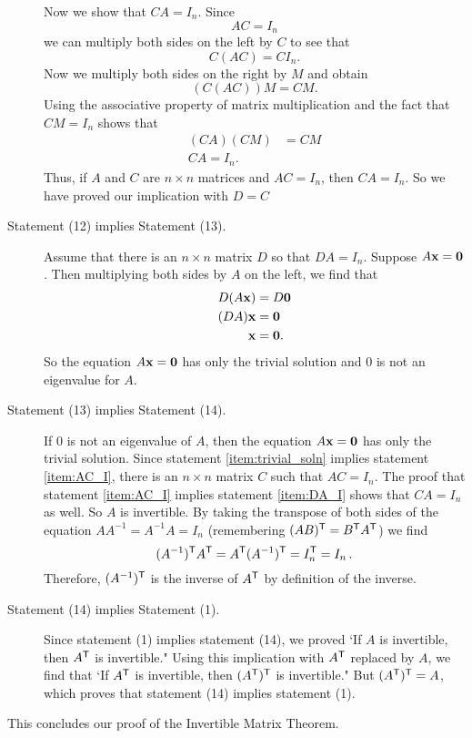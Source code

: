 \begin{description}
Now we show that $CA = I_n$. Since 
\[AC = I_n\]
we can multiply both sides on the left by $C$ to see that 
\[C(AC) = CI_n.\]
Now we multiply both sides on the right by $M$ and obtain
\[(C(AC))M = CM.\]
Using the associative property of matrix multiplication and the fact that $CM = I_n$ shows that 
\begin{align*}
(CA)(CM) &= CM \\
CA = I_n.
\end{align*}
Thus, if $A$ and $C$ are $n \times n$ matrices and $AC = I_n$, then $CA = I_n$. So we have proved our implication with $D = C$
\item[Statement (12) implies Statement (13).] Assume that there is an $n \times n$ matrix $D$ so that $DA = I_n$. Suppose $A \mathbf{x} = \mathbf{0}$. Then multiplying both sides by $A$ on the left, we find that
\begin{align*}
D(A\mathbf{x}) &= D\mathbf{0} \\
(DA) \mathbf{x} &= \mathbf{0} \\
\mathbf{x} &= \mathbf{0}.
\end{align*}
So the equation $A \mathbf{x} = \mathbf{0}$ has only the trivial solution and $0$ is not an eigenvalue for $A$. 
\item[Statement (13) implies Statement (14).] If 0 is not an eigenvalue of $A$, then the equation $A \mathbf{x} = \mathbf{0}$ has only the trivial solution. Since statement \ref{item:trivial_soln} implies statement \ref{item:AC_I}, there is an $n \times n$ matrix $C$ such that $AC = I_n$. The proof that statement \ref{item:AC_I} implies statement \ref{item:DA_I} shows that $CA = I_n$ as well. So $A$ is invertible. By taking the transpose of both sides of the equation $AA^{-1}=A^{-1}A=I_n$ (remembering $(AB)^{\mathsf{T}}= B^{\mathsf{T}}A^{\mathsf{T}}$) we find
\[ (A^{-1})^{\mathsf{T}} A^{\mathsf{T}} = A^{\mathsf{T}} (A^{-1})^{\mathsf{T}} = I_n^{\mathsf{T}}=I_n \,.\]
Therefore, $(A^{-1})^{\mathsf{T}}$ is the inverse of $A^{\mathsf{T}}$ by definition of the inverse.
\item[Statement (14) implies Statement (1).] Since statement (1) implies statement (14), we proved `If $A$ is invertible, then $A^{\mathsf{T}}$ is invertible." Using this implication with $A^{\mathsf{T}}$ replaced by $A$, we find that `If $A^{\mathsf{T}}$ is invertible, then $(A^{\mathsf{T}})^{\mathsf{T}}$ is invertible." But $(A^{\mathsf{T}})^{\mathsf{T}}=A$, which proves that statement (14) implies statement (1).
\end{description}
This concludes our proof of the Invertible Matrix Theorem.


\label{sec:imt_exam}

\ExampleIntro

